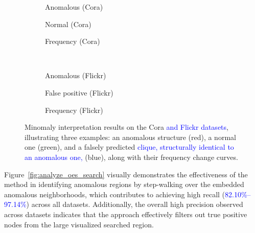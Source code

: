 \documentclass[preprint,12pt]{elsarticle}
\newcommand{\new}[1]{\textcolor{blue}{#1}}
\theoremstyle{plain}
\theoremstyle{definition}
\theoremstyle{remark}
\begin{document}
\begin{figure}[htbp]
    \centering
    \begin{subfigure}{0.22\textwidth}
        \resizebox{\linewidth}{!}{}
        \caption{Anomalous (Cora)}
        \label{fig:true_positive}
    \end{subfigure}
    \hfill
    \begin{subfigure}{0.22\textwidth}
        \resizebox{\linewidth}{!}{}
        \caption{Normal (Cora)}
        \label{fig:true_negative}
    \end{subfigure}
    \hfill
    \begin{subfigure}{0.5\textwidth}
        \resizebox{\linewidth}{!}{}
        \caption{Frequency (Cora)}
        \label{fig:frequency_track}
    \end{subfigure}
    \\[8pt]
    \begin{subfigure}{0.22\textwidth}
        \resizebox{\linewidth}{!}{}
        \caption{Anomalous (Flickr)}
        \label{fig:flickr_tp}
    \end{subfigure}
    \hfill
    \begin{subfigure}{0.22\textwidth}
        \resizebox{\linewidth}{!}{}
        \caption{False positive (Flickr)}
        \label{fig:false_positive}
    \end{subfigure}
    \hfill
    \begin{subfigure}{0.5\textwidth}
        \resizebox{\linewidth}{!}{}
        \caption{Frequency (Flickr)}
        \label{fig:false_positive_freq}
    \end{subfigure}
    \caption{Minomaly interpretation results on the Cora \new{and Flickr datasets}, illustrating three examples: an anomalous structure (red), a normal one (green), and a falsely predicted \new{clique, structurally identical to an anomalous one,} (blue), along with their frequency change curves.}
    \label{fig:interpret_results}
\end{figure}

Figure~\ref{fig:analyze_oes_search} visually demonstrates the effectiveness of the method in identifying anomalous regions by step-walking over the embedded anomalous neighborhoods, which contributes to achieving high recall (\new{82.10\%--97.14\%}) across all datasets. Additionally, the overall high precision observed across datasets indicates that the approach effectively filters out true positive nodes from the large visualized searched region.
\end{document}
